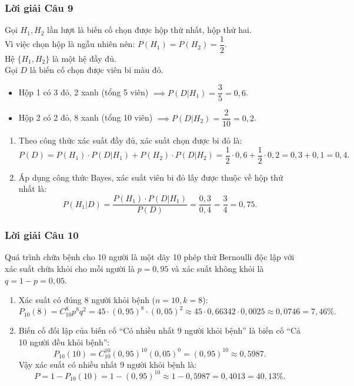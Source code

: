 \documentclass[12pt,a4paper]{article}
\theoremstyle{definition}
\begin{document}
\subsubsection*{Lời giải Câu 9}
Gọi $H_1, H_2$ lần lượt là biến cố chọn được hộp thứ nhất, hộp thứ hai.\\
Vì việc chọn hộp là ngẫu nhiên nên: $P(H_1) = P(H_2) = \dfrac{1}{2}$.\\
Hệ $\{H_1, H_2\}$ là một hệ đầy đủ.\\
Gọi $D$ là biến cố chọn được viên bi màu đỏ.
\begin{itemize}
    \item Hộp 1 có 3 đỏ, 2 xanh (tổng 5 viên) $\implies P(D|H_1) = \dfrac{3}{5} = 0{,}6$.
    \item Hộp 2 có 2 đỏ, 8 xanh (tổng 10 viên) $\implies P(D|H_2) = \dfrac{2}{10} = 0{,}2$.
\end{itemize}
\begin{enumerate}[label=\arabic*.]
    \item Theo công thức xác suất đầy đủ, xác suất chọn được bi đỏ là:
    \[
    P(D) = P(H_1) \cdot P(D|H_1) + P(H_2) \cdot P(D|H_2) = \frac{1}{2} \cdot 0{,}6 + \frac{1}{2} \cdot 0{,}2 = 0{,}3 + 0{,}1 = 0{,}4.
    \]
    \item Áp dụng công thức Bayes, xác suất viên bi đỏ lấy được thuộc về hộp thứ nhất là:
    \[
    P(H_1|D) = \frac{P(H_1) \cdot P(D|H_1)}{P(D)} = \frac{0{,}3}{0{,}4} = \frac{3}{4} = 0{,}75.
    \]
\end{enumerate}

\subsubsection*{Lời giải Câu 10}
Quá trình chữa bệnh cho 10 người là một dãy 10 phép thử Bernoulli độc lập với xác suất chữa khỏi cho mỗi người là $p = 0{,}95$ và xác suất không khỏi là $q = 1 - p = 0{,}05$.
\begin{enumerate}[label=\alph*)]
    \item Xác suất có đúng 8 người khỏi bệnh ($n = 10, k = 8$):
    \[
    P_{10}(8) = C_{10}^8 p^8 q^2 = 45 \cdot (0{,}95)^8 \cdot (0{,}05)^2 \approx 45 \cdot 0{,}66342 \cdot 0{,}0025 \approx 0{,}0746 = 7{,}46\%.
    \]
    \item Biến cố đối lập của biến cố ``Có nhiều nhất 9 người khỏi bệnh'' là biến cố ``Cả 10 người đều khỏi bệnh'':
    \[
    P_{10}(10) = C_{10}^{10} (0{,}95)^{10} (0{,}05)^0 = (0{,}95)^{10} \approx 0{,}5987.
    \]
    Vậy xác suất có nhiều nhất 9 người khỏi bệnh là:
    \[
    P = 1 - P_{10}(10) = 1 - (0{,}95)^{10} \approx 1 - 0{,}5987 = 0{,}4013 = 40{,}13\%.
    \]
\end{enumerate}
\end{document}
